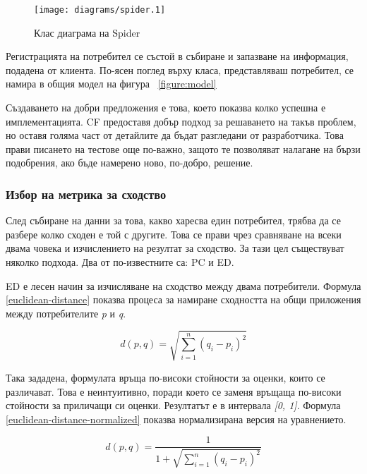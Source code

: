 		\begin{figure}[htbp]
			\centering
 			\texttt{[image: diagrams/spider.1]}
			\caption{Клас диаграма на Spider}
			\label{figure:spider}
		\end{figure}
		
		Регистрацията на потребител се състой в събиране и запазване на информация, подадена от клиента. По-ясен поглед върху класа, представляваш потребител, се намира в общия модел на фигура ~\ref{figure:model}
		
		Създаването на добри предложения е това, което показва колко успешна е имплементацията. \ac{CF} предоставя добър подход за решаването на такъв проблем, но оставя голяма част от детайлите да бъдат разгледани от разработчика.
		Това прави писането на тестове още по-важно, защото те позволяват налагане на бързи подобрения, ако бъде намерено ново, по-добро, решение.
		
		\subsubsection{Избор на метрика за сходство}
		
		След събиране на данни за това, какво харесва един потребител, трябва да се разбере колко сходен е той с другите. Това се прави чрез сравняване на всеки двама човека и изчислението на резултат за сходство. За тази цел съществуват няколко подхода. Два от по-известните са: \ac{PC} и \ac{ED}.
		
		\ac{ED} е лесен начин за изчисляване на сходство между двама потребители. Формула \eqref{euclidean-distance} показва процеса за намиране сходността на общи приложения между потребителите \emph{p} и \emph{q}.
		
		\begin{equation}\label{euclidean-distance}
			d(p, q) = \sqrt{\sum\limits_{i=1}^n(q_i - p_i)^2}
		\end{equation}
		
		Така зададена, формулата връща по-високи стойности за оценки, които се различават. Това е неинтуитивно, поради което се заменя връщаща по-високи стойности за приличащи си оценки. Резултатът е в интервала \emph{[0, 1]}\cite{Segaran}. Формула \eqref{euclidean-distance-normalized} показва нормализирана версия на уравнението.

		\begin{equation}\label{euclidean-distance-normalized}
			d(p, q) = \frac{1}{1 + \sqrt{\sum\limits_{i=1}^n(q_i - p_i)^2}}
		\end{equation}
		
